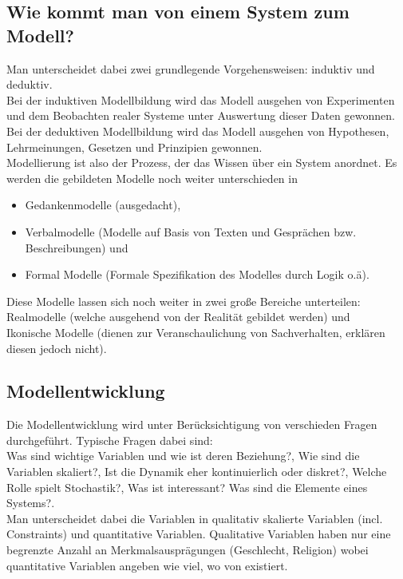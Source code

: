 \documentclass[11pt, fleqn, a4paper, leqno]{scrartcl} %
\begin{document}
	\subsection{Wie kommt man von einem System zum Modell?}
		Man unterscheidet dabei zwei grundlegende Vorgehensweisen: induktiv und deduktiv.\\
		Bei der induktiven Modellbildung wird das Modell ausgehen von Experimenten und dem Beobachten realer Systeme unter Auswertung dieser Daten gewonnen.\\
		Bei der deduktiven Modellbildung wird das Modell ausgehen von Hypothesen, Lehrmeinungen, Gesetzen und Prinzipien gewonnen.\\
		Modellierung ist also der Prozess, der das Wissen über ein System anordnet. Es werden die gebildeten Modelle noch weiter unterschieden in 
		\begin{itemize}
			\item Gedankenmodelle (ausgedacht), 
			\item Verbalmodelle (Modelle auf Basis von Texten und Gesprächen bzw. Beschreibungen) und 
			\item Formal Modelle (Formale Spezifikation des Modelles durch Logik o.ä). 	
		\end{itemize}		
		Diese Modelle lassen sich noch weiter in zwei große Bereiche unterteilen:\\
		Realmodelle (welche ausgehend von der Realität gebildet werden) und \\
		Ikonische Modelle (dienen zur Veranschaulichung von Sachverhalten, erklären diesen jedoch nicht).
	\subsection{Modellentwicklung}
		Die Modellentwicklung wird unter Berücksichtigung von verschieden Fragen durchgeführt. Typische Fragen dabei sind:\\
		Was sind wichtige Variablen und wie ist deren Beziehung?, Wie sind die Variablen skaliert?, Ist die Dynamik eher kontinuierlich oder diskret?, Welche Rolle spielt Stochastik?, Was ist interessant? Was sind die Elemente eines Systems?.\\
		Man unterscheidet dabei die Variablen in qualitativ skalierte Variablen (incl. Constraints) und quantitative Variablen. Qualitative Variablen haben nur eine begrenzte Anzahl an Merkmalsausprägungen (Geschlecht, Religion) wobei quantitative Variablen angeben wie viel, wo von existiert.
\end{document}
